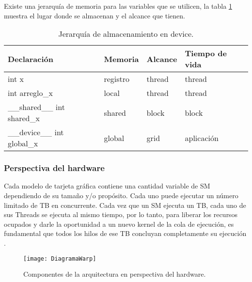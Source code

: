     Existe una jerarquía de memoria para las variables que se utilicen, la tabla \ref{tab:memoriaCUDA} muestra el lugar donde se almacenan y el alcance que tienen.
    
         \begin{table}[h!]
         \footnotesize
      \begin{center}
        \begin{tabular}{|m{4.6cm}|m{2.6cm}|m{2.6cm}|m{3cm}|}
         \hline
         \cellcolor{lightgray}\textbf{Declaración} & 
         \cellcolor{lightgray}\textbf{Memoria} &
         \cellcolor{lightgray}\textbf{Alcance} &
         \cellcolor{lightgray}\textbf{Tiempo de vida}\\ 
         \hline
        int x & registro & thread & thread\\ 
         \hline
        int arreglo\_x & local & thread & thread\\ 
         \hline
        \_\_shared\_\_ int shared\_x & shared & block & block\\ 
         \hline
        \_\_device\_\_ int global\_x & global & grid & aplicación\\ 
         \hline
           \end{tabular}
        \caption{Jerarquía de almacenamiento en device.}
        \label{tab:memoriaCUDA}
      \end{center}
    \end{table}
    
    \subsubsection{Perspectiva del hardware}
    
    Cada modelo de tarjeta gráfica contiene una cantidad variable de SM dependiendo de su tamaño y/o propósito. Cada uno puede ejecutar un número limitado de TB en concurrente. 
    Cada vez que un SM ejecuta un TB, cada uno de sus Threads se ejecuta al mismo tiempo, por lo tanto, para liberar los recursos ocupados y darle la oportunidad a un nuevo kernel de la cola de ejecución, es fundamental que todos los hilos de ese TB concluyan completamente su ejecución \cite{CuLect2}.
    \newline
            \begin{figure}[!h]
      \centering
        \texttt{[image: DiagramaWarp]}
        \caption{Componentes de la arquitectura en perspectiva del hardware\cite{DiagramaWarp}.}
        \label{fig:DiagramaWarp}
    \end{figure}
    
